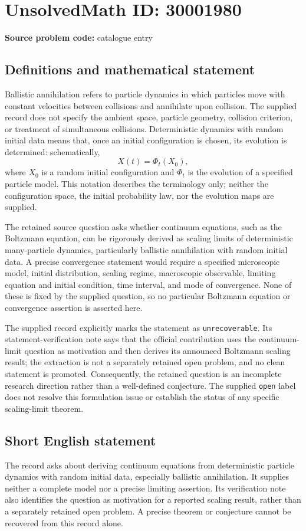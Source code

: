 \documentclass[11pt]{article}
\begin{document}
\section*{UnsolvedMath ID: 30001980}
\textbf{Source problem code:} catalogue entry
\subsection{Definitions and mathematical statement}
Ballistic annihilation refers to particle dynamics in which particles move with constant velocities between collisions and annihilate upon collision. The supplied record does not specify the ambient space, particle geometry, collision criterion, or treatment of simultaneous collisions. Deterministic dynamics with random initial data means that, once an initial configuration is chosen, its evolution is determined: schematically,
\[
X(t)=\Phi_t(X_0),
\]
where \(X_0\) is a random initial configuration and \(\Phi_t\) is the evolution of a specified particle model. This notation describes the terminology only; neither the configuration space, the initial probability law, nor the evolution maps are supplied.

The retained source question asks whether continuum equations, such as the Boltzmann equation, can be rigorously derived as scaling limits of deterministic many-particle dynamics, particularly ballistic annihilation with random initial data. A precise convergence statement would require a specified microscopic model, initial distribution, scaling regime, macroscopic observable, limiting equation and initial condition, time interval, and mode of convergence. None of these is fixed by the supplied question, so no particular Boltzmann equation or convergence assertion is asserted here.

The supplied record explicitly marks the statement as \texttt{unrecoverable}. Its statement-verification note says that the official contribution uses the continuum-limit question as motivation and then derives its announced Boltzmann scaling result; the extraction is not a separately retained open problem, and no clean statement is promoted. Consequently, the retained question is an incomplete research direction rather than a well-defined conjecture. The supplied \texttt{open} label does not resolve this formulation issue or establish the status of any specific scaling-limit theorem.
\subsection{Short English statement}
The record asks about deriving continuum equations from deterministic particle dynamics with random initial data, especially ballistic annihilation. It supplies neither a complete model nor a precise limiting assertion. Its verification note also identifies the question as motivation for a reported scaling result, rather than a separately retained open problem. A precise theorem or conjecture cannot be recovered from this record alone.
\end{document}
